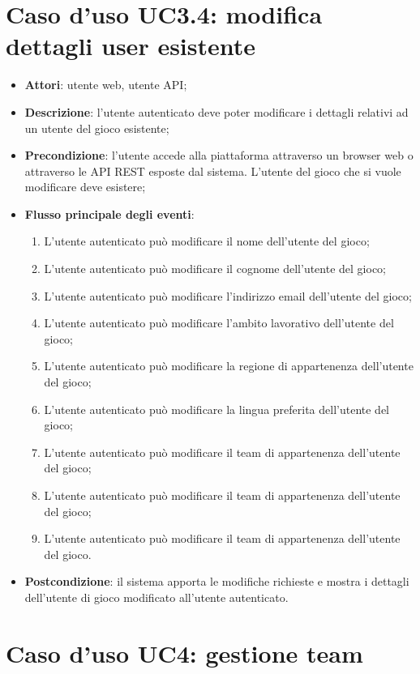 \section{Caso d'uso UC3.4: modifica dettagli user esistente}
\begin{itemize}
\item \textbf{Attori}: utente web, utente API;
\item \textbf{Descrizione}: l'utente autenticato deve poter modificare i dettagli relativi ad un utente del gioco esistente; 
      \item \textbf{Precondizione}: l'utente accede alla piattaforma attraverso un browser web o attraverso le API REST esposte dal sistema. L'utente del gioco che si vuole modificare deve esistere;

        \item \textbf{Flusso principale degli eventi}:
          \begin{enumerate}
          \item L'utente autenticato può modificare il nome dell'utente del gioco;
          \item L'utente autenticato può modificare il cognome dell'utente del gioco;
          \item L'utente autenticato può modificare l'indirizzo email dell'utente del gioco;
          \item L'utente autenticato può modificare l'ambito lavorativo dell'utente del gioco;
          \item L'utente autenticato può modificare la regione di appartenenza dell'utente del gioco;
          \item L'utente autenticato può modificare la lingua preferita dell'utente del gioco;
          \item L'utente autenticato può modificare il team di appartenenza dell'utente del gioco;
          \item L'utente autenticato può modificare il team di appartenenza dell'utente del gioco;
          \item L'utente autenticato può modificare il team di appartenenza dell'utente del gioco.

      \end{enumerate}
    \item \textbf{Postcondizione}: il sistema apporta le modifiche richieste e mostra i dettagli dell'utente di gioco modificato all'utente autenticato.
  \end{itemize}
\hypertarget{UC4}{}
\section{Caso d'uso UC4: gestione team}

